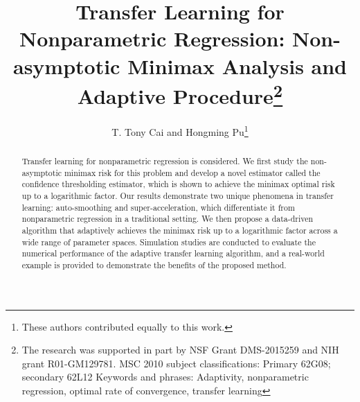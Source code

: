 \documentclass{article}
\begin{document}
 
	
	
\title{Transfer Learning for Nonparametric Regression: Non-asymptotic Minimax Analysis and Adaptive Procedure\footnote{
The research was supported in part by NSF Grant DMS-2015259 and NIH grant
R01-GM129781.
MSC 2010 subject classifications: Primary 62G08; secondary 62L12
Keywords and phrases: Adaptivity, nonparametric regression, optimal rate of convergence, transfer learning
}}  
\author[]{T. Tony Cai and Hongming Pu\footnote{These authors contributed equally to this work.}}
\date{}

\maketitle
	
  
\begin{abstract}
Transfer learning for nonparametric regression is considered. We first study the non-asymptotic minimax risk for this problem and develop a novel estimator called the confidence thresholding estimator, which is shown to achieve the minimax optimal risk up to a logarithmic factor. Our results demonstrate two unique phenomena in transfer learning: auto-smoothing and super-acceleration, which differentiate it from nonparametric regression in a traditional setting. We then propose a data-driven algorithm that adaptively achieves the minimax risk up to a logarithmic factor across a wide range of parameter spaces. Simulation studies are conducted to evaluate the  numerical performance of the adaptive transfer learning algorithm, and a real-world example is provided to demonstrate the benefits of the proposed method.
\end{abstract}
\end{document}
